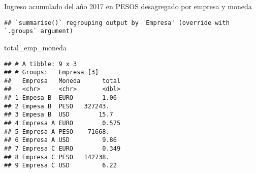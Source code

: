 \documentclass[]{article}
\newenvironment{Shaded}{\begin{snugshade}}{\end{snugshade}}
\newcommand{\DataTypeTok}[1]{\textcolor[rgb]{0.13,0.29,0.53}{#1}}
\newcommand{\KeywordTok}[1]{\textcolor[rgb]{0.13,0.29,0.53}{\textbf{#1}}}
\newcommand{\NormalTok}[1]{#1}
\newcommand{\OperatorTok}[1]{\textcolor[rgb]{0.81,0.36,0.00}{\textbf{#1}}}
\newcommand{\StringTok}[1]{\textcolor[rgb]{0.31,0.60,0.02}{#1}}
\begin{document}
Ingreso acumulado del año 2017 en PESOS desagregado por empresa y moneda

\begin{Shaded}
\end{Shaded}

\begin{verbatim}
## `summarise()` regrouping output by 'Empresa' (override with `.groups` argument)
\end{verbatim}

\begin{Shaded}
\begin{Highlighting}[]
\NormalTok{total_emp_moneda}
\end{Highlighting}
\end{Shaded}

\begin{verbatim}
## # A tibble: 9 x 3
## # Groups:   Empresa [3]
##   Empresa   Moneda      total
##   <chr>     <chr>       <dbl>
## 1 Empesa B  EURO        1.06 
## 2 Empesa B  PESO   327243.   
## 3 Empesa B  USD        15.7  
## 4 Empresa A EURO        0.575
## 5 Empresa A PESO    71668.   
## 6 Empresa A USD         9.86 
## 7 Empresa C EURO        0.349
## 8 Empresa C PESO   142738.   
## 9 Empresa C USD         6.22
\end{verbatim}
\end{document}
